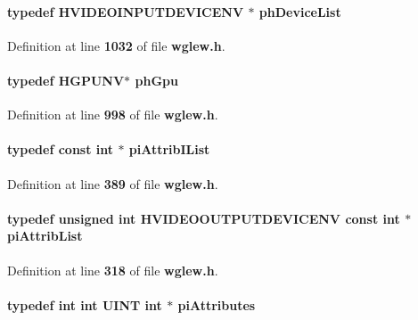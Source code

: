 \paragraph[{ph\+Device\+List}]{\setlength{\rightskip}{0pt plus 5cm}typedef H\+V\+I\+D\+E\+O\+I\+N\+P\+U\+T\+D\+E\+V\+I\+C\+E\+NV $\ast$ {\bf ph\+Device\+List}}\label{wglew_8h_afd25233431ba8de61bfc2be8fa9a7981}


Definition at line {\bf 1032} of file {\bf wglew.\+h}.

\paragraph[{ph\+Gpu}]{\setlength{\rightskip}{0pt plus 5cm}typedef H\+G\+P\+U\+NV$\ast$ {\bf ph\+Gpu}}\label{wglew_8h_a7a1268ce60dee3728746196f8f040dde}


Definition at line {\bf 998} of file {\bf wglew.\+h}.

\paragraph[{pi\+Attrib\+I\+List}]{\setlength{\rightskip}{0pt plus 5cm}typedef const {\bf int} $\ast$ {\bf pi\+Attrib\+I\+List}}\label{wglew_8h_a7c969529e6d5a2ba58aed6735fd416fd}


Definition at line {\bf 389} of file {\bf wglew.\+h}.

\paragraph[{pi\+Attrib\+List}]{\setlength{\rightskip}{0pt plus 5cm}typedef unsigned {\bf int} H\+V\+I\+D\+E\+O\+O\+U\+T\+P\+U\+T\+D\+E\+V\+I\+C\+E\+NV const {\bf int} $\ast$ {\bf pi\+Attrib\+List}}\label{wglew_8h_ae83d0e683f28988d695e05fcf2bf34a9}


Definition at line {\bf 318} of file {\bf wglew.\+h}.

\paragraph[{pi\+Attributes}]{\setlength{\rightskip}{0pt plus 5cm}typedef {\bf int} {\bf int} {\bf U\+I\+NT} {\bf int} $\ast$ {\bf pi\+Attributes}}\label{wglew_8h_a02bd9a619ff024959a639fb0e427b450}


